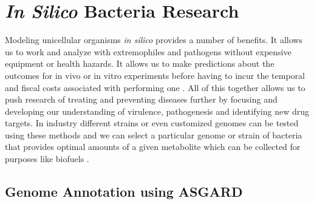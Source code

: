 
\section{\textit{In Silico} Bacteria Research}

\indent\indent Modeling unicellular organisms \textit{in silico} provides a number of benefits. It allows us to work and analyze with extremophiles and pathogens without expensive equipment or health hazards. It allows us to make predictions about the outcomes for in vivo or in vitro experiments before having to incur the temporal and fiscal costs associated with performing one \citep{langowski_computer_2002}. All of this together allows us to push research of treating and preventing diseases further by focusing and developing our understanding of virulence, pathogenesis and identifying new drug targets\citep{shlomi_network-based_2008}\citep{nurputra_paramyotonia_2012}. In industry different strains or even customized genomes can be tested using these methods and we can select a particular genome or strain of bacteria that provides optimal amounts of a given metabolite which can be collected for purposes like biofuels \citep{nogales_silico_2012}. \\
\subsection{Genome Annotation using ASGARD}


